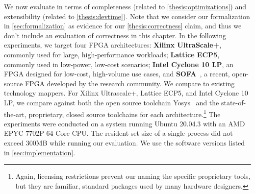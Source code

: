 \label{sec:evaluation}

We now evaluate
  \lr in terms of completeness
  (related to \cref{thesis:optimizations})
  and extensibility
  (related to \cref{thesis:devtime}).
Note that we consider our formalization
  in \cref{sec:formalization}
  as evidence for our \cref{thesis:correctness}
  claim,
  and thus we don't include
  an evaluation of correctness
  in this chapter.
In the following experiments,
  we target four FPGA architectures:
  \textbf{Xilinx UltraScale+},
  commonly used
  for large, high-performance workloads;
  \textbf{Lattice ECP5},
  commonly used 
  in low-power, low-cost scenarios;
  \textbf{Intel Cyclone 10 LP},
  an FPGA designed for low-cost,
  high-volume use cases,
  and 
  \textbf{SOFA}~\cite{sofa},
  a recent, open-source
  FPGA developed by the
  research community.
We compare \lr to existing
  technology mappers.
For
  Xilinx Ultrascale+, Lattice ECP5, and
  Intel Cyclone 10 LP,
  we compare \lr against both
  the open source toolchain Yosys~\cite{wolf2013yosys}
  and the
  state-of-the-art,
  proprietary, closed source
  toolchains
  for each architecture.\footnote{
    Again, licensing restrictions 
    prevent our naming the specific 
    proprietary tools, but
    they are familiar, standard packages 
    used by many hardware designers.}\tighten
The experiments were conducted 
  on a system running Ubuntu 20.04.3 
  with an AMD EPYC 7702P 64-Core CPU.
The resident set size of a single \lr process
  did not exceed
  300MB while running our evaluation.
We use the software versions listed in \cref{sec:implementation}.

